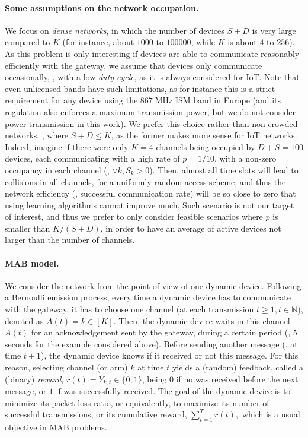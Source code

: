 \paragraph{Some assumptions on the network occupation.}
%
We focus on \emph{dense networks}, in which the number of devices $S + D$ is very large compared to $K$ (for instance, about $1000$ to $100000$, while $K$ is about $4$ to $256$).
As this problem is only interesting if devices are able to communicate reasonably efficiently with the gateway, we assume that devices only communicate occasionally, \ie, with a low \emph{duty cycle}, as it is always considered for IoT.
Note that even unlicensed bands have such limitations, as for instance this is a strict requirement for any device using the $867\;\mathrm{MHz}$ ISM band in Europe (and its regulation also enforces a maximum transmission power, but we do not consider power transmission in this work).
%
We prefer this choice rather than non-crowded networks, \ie, where $S + D \leq K$, as the former makes more sense for IoT networks.
Indeed, imagine if there were only $K=4$ channels being occupied by $D+S = 100$ devices, each communicating with a high rate of $p=1/10$, with a non-zero occupancy in each channel (\ie, $\forall k, S_k > 0$). Then, almost all time slots will lead to collisions in all channels, for a uniformly random access scheme, and thus the network efficiency (\ie, successful communication rate) will be so close to zero that using learning algorithms cannot improve much.
Such scenario is not our target of interest, and thus we prefer to only consider feasible scenarios where $p$ is smaller than $K/(S+D)$, in order to have an average of active devices not larger than the number of channels.


\paragraph{MAB model.}
%
We consider the network from the point of view of one dynamic device.
Following a Bernoulli emission process, every time a dynamic device has to communicate with the gateway,
it has to choose one channel (at each transmission $t \geq 1, t \in \mathbb{N}$), denoted as $A(t) = k \in[K]$.
Then, the dynamic device waits in this channel $A(t)$ for an acknowledgement sent by the gateway, during a certain period (\eg, $5$ seconds for the example considered above).
Before sending another message (\ie, at time $t+1$), the dynamic device knows if it received or not this \Ack{} message.
%
For this reason, selecting channel (or arm) $k$ at time $t$ yields a (random) feedback, called a (binary) \emph{reward}, $r(t)=Y_{k,t} \in \{0,1\}$, being $0$ if no \Ack{} was received before the next message, or $1$ if \Ack{} was successfully received.
The goal of the dynamic device is to minimize its packet loss ratio, or equivalently, to maximize its number of successful transmissions, or its cumulative reward,
$\sum_{t = 1}^T r(t),$
which is a usual objective in MAB problems.


